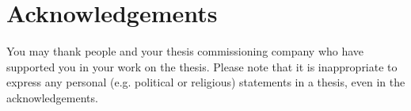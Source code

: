 \section*{Acknowledgements}

You may thank people and your thesis commissioning company who have supported you in your work on the thesis. Please note that it is inappropriate to express any personal (e.g. political or religious) statements in a thesis, even in the acknowledgements.

\lipsum[1]

\clearpage %

